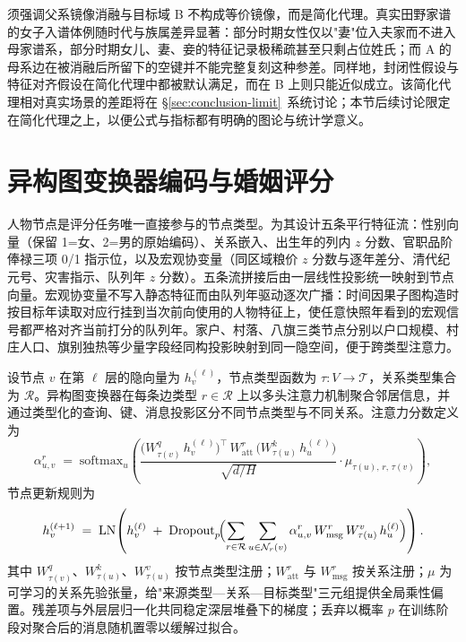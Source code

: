 须强调父系镜像消融与目标域 B 不构成等价镜像，而是简化代理。真实田野家谱的女子入谱体例随时代与族属差异显著：部分时期女性仅以"妻"位入夫家而不进入母家谱系，部分时期女儿、妻、妾的特征记录极稀疏甚至只剩占位姓氏\citep{yan2009nuzi}；而 A 的母系边在被消融后所留下的空键并不能完整复刻这种参差。同样地，封闭性假设与特征对齐假设在简化代理中都被默认满足，而在 B 上则只能近似成立。该简化代理相对真实场景的差距将在 \S\ref{sec:conclusion-limit}~系统讨论；本节后续讨论限定在简化代理之上，以便公式与指标都有明确的图论与统计学意义。

\section{异构图变换器编码与婚姻评分}\label{sec:backend-hgt}

人物节点是评分任务唯一直接参与的节点类型。为其设计五条平行特征流：性别向量（保留 1=女、2=男的原始编码）、关系嵌入、出生年的列内 \(z\) 分数、官职品阶俸禄三项 0/1 指示位，以及宏观协变量（同区域粮价 \(z\) 分数与逐年差分、清代纪元号、灾害指示、队列年 \(z\) 分数）。五条流拼接后由一层线性投影统一映射到节点向量。宏观协变量不写入静态特征而由队列年驱动逐次广播：时间因果子图构造时按目标年读取对应行挂到当次前向使用的人物特征上，使任意快照年看到的宏观信号都严格对齐当前打分的队列年。家户、村落、八旗三类节点分别以户口规模、村庄人口、旗别独热等少量字段经同构投影映射到同一隐空间，便于跨类型注意力。

设节点 \(v\) 在第 \(\ell\) 层的隐向量为 \(h_v^{(\ell)}\)，节点类型函数为 \(\tau:V\to\mathcal{T}\)，关系类型集合为 \(\mathcal{R}\)。异构图变换器在每条边类型 \(r\in\mathcal{R}\) 上以多头注意力机制\citep{vaswani2017attention}聚合邻居信息，并通过类型化的查询、键、消息投影区分不同节点类型与不同关系\citep{hu2020hgt}。注意力分数定义为
\begin{equation}\label{eq:hgt-att}
  \alpha_{u,v}^{r} \;=\; \mathrm{softmax}_u\!\left(
    \frac{\bigl(W^{q}_{\tau(v)}\,h_v^{(\ell)}\bigr)^{\!\top}\,W^{r}_{\mathrm{att}}\,\bigl(W^{k}_{\tau(u)}\,h_u^{(\ell)}\bigr)}
         {\sqrt{d/H}}
    \cdot \mu_{\tau(u),\,r,\,\tau(v)}\right),
\end{equation}
节点更新规则为
\begin{equation}\label{eq:hgt-upd}
  h_v^{(\ell+1)} \;=\; \mathrm{LN}\!\left(
    h_v^{(\ell)}\;+\;\mathrm{Dropout}_p\!\Bigl(
      \sum_{r\in\mathcal{R}}\sum_{u\in\mathcal{N}_r(v)}
        \alpha_{u,v}^{r}\,W^{r}_{\mathrm{msg}}\,W^{v}_{\tau(u)}\,h_u^{(\ell)}\Bigr)
    \right).
\end{equation}
其中 \(W^{q}_{\tau(v)}\)、\(W^{k}_{\tau(u)}\)、\(W^{v}_{\tau(u)}\) 按节点类型注册；\(W^{r}_{\mathrm{att}}\) 与 \(W^{r}_{\mathrm{msg}}\) 按关系注册；\(\mu\) 为可学习的关系先验张量，给"来源类型—关系—目标类型"三元组提供全局乘性偏置。残差项与外层层归一化共同稳定深层堆叠下的梯度；丢弃以概率 \(p\) 在训练阶段对聚合后的消息随机置零以缓解过拟合\citep{kipf2016gcn}。

